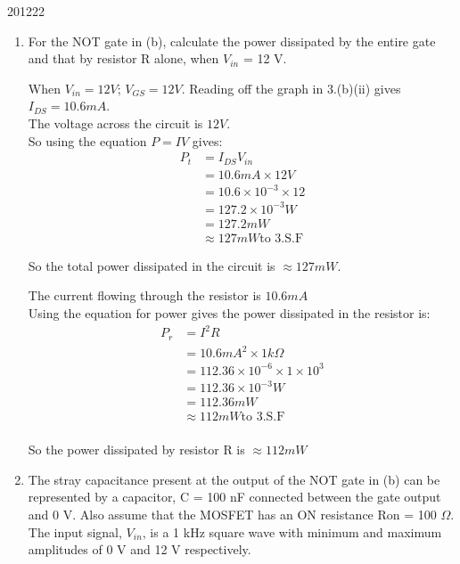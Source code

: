 \documentclass[10pt,\jkfside,a4paper]{article}
\begin{document}
\begin{enumerate}
\begin{examquestion}{2012}{2}{2}
\begin{enumerate}[label=(\alph*)]
\begin{enumerate}[label=(\roman*)]
\begin{tikzpicture}
\end{tikzpicture}


\end{enumerate}

\item{For the NOT gate in (b), calculate the power dissipated by the 
entire gate and that by resistor R alone, when $V_{in}$ = 12 V.}

When $V_{in} = 12V$; $V_{GS} = 12V$. Reading off the graph in 3.(b)(ii) gives 
$I_{DS} = 10.6mA$.\\

The voltage across the circuit is $12V$.\\
So using the equation $P=IV$ gives:
\begin{equation}
\begin{split}
P_t &= I_{DS}V_{in}\\
	&= 10.6mA \times 12V\\
	&= 10.6 \times 10^{-3} \times 12\\
	&= 127.2\times 10^{-3}W\\
	&= 127.2mW\\
	&\approx 127mW \text{to 3.S.F}
\end{split}
\end{equation}

So the total power dissipated in the circuit is $\approx 127mW$.

The current flowing through the resistor is $10.6mA$\\
Using the equation for power gives the power dissipated in the resistor is:
\begin{equation}
\begin{split}
P_r &= I^2R\\
	&= 10.6mA^2 \times 1k\Omega\\
	&= 112.36 \times 10^{-6} \times 1 \times 10^{3}\\
	&= 112.36 \times 10^{-3}W\\
	&= 112.36 mW\\
	&\approx 112mW \text{to 3.S.F}\\
\end{split}
\end{equation}

So the power dissipated by resistor R is $\approx 112mW$

\item{The stray capacitance present at the output of the NOT gate in (b) 
can be represented by a capacitor, C = 100 nF connected between the gate 
output and 0 V. Also assume that the MOSFET has an ON resistance Ron = 
100 $\Omega$. The input signal, $V_{in}$, is a 1 kHz square wave with minimum 
and maximum amplitudes of 0 V and 12 V respectively.}


\end{enumerate}
\end{examquestion}
\end{enumerate}
\end{document}

